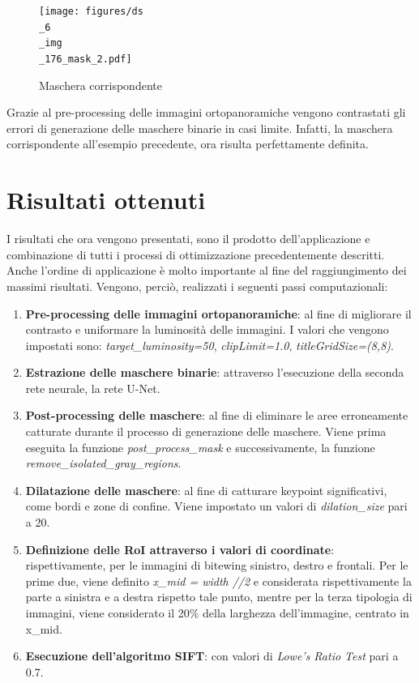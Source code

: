 \documentclass[12pt,a4paper,openright,twoside]{book}
\begin{document}
\begin{figure}[H]
	\centering
	\texttt{[image: figures/ds\\\_6\\\_img\\\_176\_mask\_2.pdf]}
    	\caption{Maschera corrispondente}
	\label{fig:maskLuminosa}
\end{figure}
Grazie al pre-processing delle immagini ortopanoramiche vengono contrastati gli errori di generazione delle maschere binarie in casi limite.
Infatti, la maschera corrispondente all'esempio precedente, ora risulta perfettamente definita.

\section{Risultati ottenuti}
I risultati che ora vengono presentati, sono il prodotto dell'applicazione e combinazione di tutti i processi di ottimizzazione precedentemente descritti. Anche l'ordine di applicazione è molto importante al fine del raggiungimento dei massimi risultati. Vengono, perciò, realizzati i seguenti passi computazionali:
\begin{enumerate}
\item \textbf{Pre-processing delle immagini ortopanoramiche}: al fine di migliorare il contrasto e uniformare la luminosità delle immagini. I valori che vengono impostati sono: {\itshape target\_luminosity=50}, {\itshape clipLimit=1.0}, {\itshape titleGridSize=(8,8)}.
\item \textbf{Estrazione delle maschere binarie}: attraverso l'esecuzione della seconda rete neurale, la rete U-Net.
\item \textbf{Post-processing delle maschere}: al fine di eliminare le aree erroneamente catturate durante il processo di generazione delle maschere. Viene prima eseguita la funzione {\itshape post\_process\_mask} e successivamente, la funzione {\itshape remove\_isolated\_gray\_regions}.
\item \textbf{Dilatazione delle maschere}: al fine di catturare keypoint significativi, come bordi e zone di confine. Viene impostato un valori di {\itshape dilation\_size} pari a 20.
\item \textbf{Definizione delle RoI attraverso i valori di coordinate}: rispettivamente, per le immagini di bitewing sinistro, destro e frontali. Per le prime due, viene definito {\itshape x\_mid = width //2} e considerata rispettivamente la parte a sinistra e a destra rispetto tale punto, mentre per la terza tipologia di immagini, viene considerato il 20\% della larghezza dell'immagine, centrato in x\_mid.
\item \textbf{Esecuzione dell'algoritmo SIFT}: con valori di {\itshape Lowe's Ratio Test} pari a 0.7.
\end{enumerate}
\end{document}
